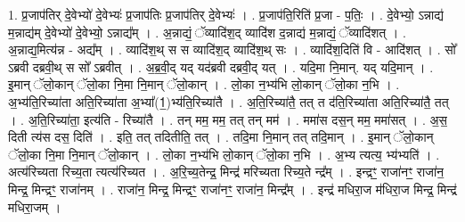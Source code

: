 \documentclass[17pt]{extarticle}
\begin{document}
1. प्र॒जाप॑तिर् दे॒वेभ्यो॑ दे॒वेभ्यः॑ प्र॒जाप॑तिः प्र॒जाप॑तिर् दे॒वेभ्यः॑ । . प्र॒जाप॑ति॒रिति॑ प्र॒जा - प॒तिः॒ । . दे॒वेभ्यो॒ ऽन्नाद्य॑ म॒न्नाद्य॑म् दे॒वेभ्यो॑ दे॒वेभ्यो॒ ऽन्नाद्य᳚म् । . अ॒न्नाद्यं॒ ॅव्यादि॑श॒द् व्यादि॑श द॒न्नाद्य॑ म॒न्नाद्यं॒ ॅव्यादि॑शत् । . अ॒न्नाद्य॒मित्य॑न्न - अद्य᳚म् । . व्यादि॑श॒थ् स स व्यादि॑श॒द् व्यादि॑श॒थ् सः । . व्यादि॑श॒दिति॑ वि - आदि॑शत् । . सो᳚ ऽब्रवी दब्रवी॒थ् स सो᳚ ऽब्रवीत् । . अ॒ब्र॒वी॒द् यद् यद॑ब्रवी दब्रवी॒द् यत् । . यदि॒मा नि॒मान्. यद् यदि॒मान् । . इ॒मान् ॅलो॒कान् ॅलो॒का नि॒मा नि॒मान् ॅलो॒कान् । . लो॒का न॒भ्य॑भि लो॒कान् ॅलो॒का न॒भि । . अ॒भ्य॑ति॒रिच्या॑ता अति॒रिच्या॑ता अ॒भ्या᳚(1॒)भ्य॑ति॒रिच्या॑तै । . अ॒ति॒रिच्या॑तै॒ तत् त द॑ति॒रिच्या॑ता अति॒रिच्या॑तै॒ तत् । . अ॒ति॒रिच्या॑ता॒ इत्य॑ति - रिच्या॑तै । . तन् मम॒ मम॒ तत् तन् मम॑ । . ममा॑स दस॒न् मम॒ ममा॑सत् । . अ॒स॒ दिती त्य॑स दस॒ दिति॑ । . इति॒ तत् तदितीति॒ तत् । . तदि॒मा नि॒मान् तत् तदि॒मान् । . इ॒मान् ॅलो॒कान् ॅलो॒का नि॒मा नि॒मान् ॅलो॒कान् । . लो॒का न॒भ्य॑भि लो॒कान् ॅलो॒का न॒भि । . अ॒भ्य त्यत्य॒ भ्य॑भ्यति॑ । . अत्य॑रिच्यता रिच्य॒ता त्यत्य॑रिच्यत । . अ॒रि॒च्य॒तेन्द्र॒ मिन्द्र॑ मरिच्यता रिच्य॒ते न्द्र᳚म् । . इन्द्रꣳ॒॒ राजा॑नꣳ॒॒ राजा॑न॒ मिन्द्र॒ मिन्द्रꣳ॒॒ राजा॑नम् । . राजा॑न॒ मिन्द्र॒ मिन्द्रꣳ॒॒ राजा॑नꣳ॒॒ राजा॑न॒ मिन्द्र᳚म् । . इन्द्र॑ मधिरा॒ज म॑धिरा॒ज मिन्द्र॒ मिन्द्र॑ मधिरा॒जम् । \newline
\end{document}
